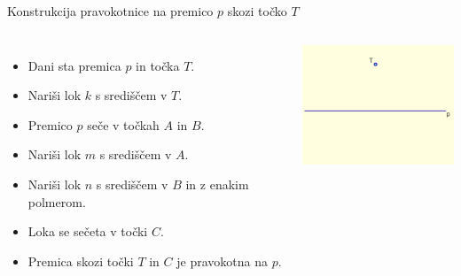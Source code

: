 \begin{frame}{Konstrukcija pravokotnice na premico $p$ skozi točko $T$}
	
	\begin{columns}
			\begin{itemize}
				 \item Dani sta premica $p$ in točka $T$.
				 \item Nariši lok $k$ s središčem v $T$.
				 \item Premico $p$ seče v točkah $A$ in $B$.
				 \item Nariši lok $m$ s središčem v $A$.
				 \item Nariši lok $n$ s središčem v $B$ in z enakim polmerom.
				 \item Loka se sečeta v točki $C$.
				 \item Premica skozi točki $T$ in $C$ je pravokotna na $p$.
			  \end{itemize}
	
		\centering
		  \includegraphics[width=50mm]{slike/fig-1.png}%
	\end{columns}
\end{frame}


				
